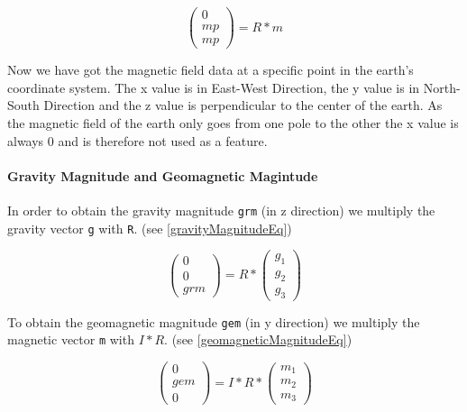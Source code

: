 \begin{equation} \label{magneticProcessedEq}
\begin{pmatrix}
0 \\
mp \\
mp
\end{pmatrix} 
 = R * m
\end{equation}

Now we have got the magnetic field data at a specific point in the earth's coordinate system. The x value is in East-West Direction, the y value is in North-South Direction and the z value is perpendicular to the center of the earth. As the magnetic field of the earth only goes from one pole to the other the x value is always 0 and is therefore not used as a feature.


\paragraph{Gravity Magnitude and Geomagnetic Magintude}
In order to obtain the gravity magnitude \texttt{grm} (in z direction) we multiply the gravity vector \texttt{g} with \texttt{R}. (see \ref{gravityMagnitudeEq})


\begin{equation} \label{gravityMagnitudeEq}
\begin{pmatrix}
0 \\
0 \\
grm
\end{pmatrix} 
 = R * 
\begin{pmatrix}
g_1 \\
g_2 \\
g_3
\end{pmatrix}
\end{equation}


To obtain the geomagnetic magnitude \texttt{gem} (in y direction) we multiply the magnetic vector \texttt{m} with $I*R$. (see \ref{geomagneticMagnitudeEq})

\begin{equation} \label{geomagneticMagnitudeEq}
\begin{pmatrix}
0 \\
gem \\
0
\end{pmatrix} 
 = I * R * 
\begin{pmatrix}
m_1 \\
m_2 \\
m_3
\end{pmatrix}
\end{equation}

